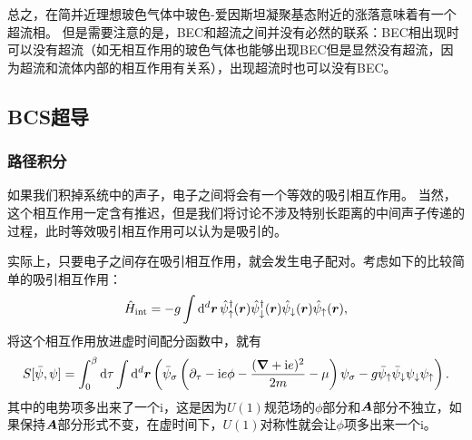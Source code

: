 \documentclass[hyperref, UTF8, a4paper]{ctexart}
\newcommand*{\ii}{\mathrm{i}}
\begin{document}
总之，在简并近理想玻色气体中玻色-爱因斯坦凝聚基态附近的涨落意味着有一个超流相。
但是需要注意的是，BEC和超流之间并没有必然的联系：BEC相出现时可以没有超流（如无相互作用的玻色气体也能够出现BEC但是显然没有超流，因为超流和流体内部的相互作用有关系），出现超流时也可以没有BEC。

\subsection{BCS超导}

\subsubsection{路径积分}

如果我们积掉系统中的声子，电子之间将会有一个等效的吸引相互作用。
当然，这个相互作用一定含有推迟，但是我们将讨论不涉及特别长距离的中间声子传递的过程，此时等效吸引相互作用可以认为是吸引的。

实际上，只要电子之间存在吸引相互作用，就会发生电子配对。考虑如下的比较简单的吸引相互作用：
\begin{equation}
    \hat{H}_\text{int} = - g \int \dd[d]{\vb*{r}} \hat{\psi}^\dagger_\uparrow(\vb*{r}) \hat{\psi}^\dagger_{\downarrow}(\vb*{r}) \hat{\psi}_{\downarrow}(\vb*{r}) \hat{\psi}_\uparrow(\vb*{r}),
\end{equation}
将这个相互作用放进虚时间配分函数中，就有
\begin{equation}
    S[\bar{\psi}, \psi] = \int_0^\beta \dd{\tau} \int \dd[d]{\vb*{r}} \left(
        \bar{\psi}_\sigma \left( \partial_\tau - \ii e \phi - \frac{(\grad + \ii e)^2}{2m} - \mu \right) \psi_\sigma - g \bar{\psi}_\uparrow \bar{\psi}_\downarrow \psi_\downarrow \psi_\uparrow
    \right).
\end{equation}
其中的电势项多出来了一个$\ii$，这是因为$U(1)$规范场的$\phi$部分和$\vb*{A}$部分不独立，如果保持$\vb*{A}$部分形式不变，在虚时间下，$U(1)$对称性就会让$\phi$项多出来一个$\ii$。
\end{document}
